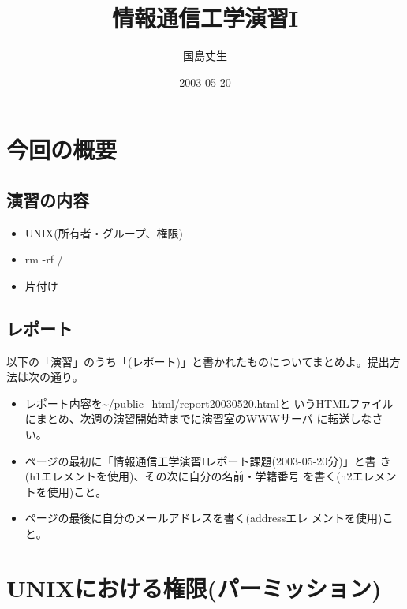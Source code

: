 \documentclass[a4j,10pt]{jarticle}
\begin{document}
\title{情報通信工学演習I}
\author{国島丈生}
\date{2003-05-20}
\maketitle
\section{今回の概要}
\subsection{演習の内容}
\begin{itemize}
 \item UNIX(所有者・グループ、権限)
 \item rm -rf /
 \item 片付け
\end{itemize}

\subsection{レポート}
以下の「演習」のうち「(レポート)」と書かれたものについてまとめよ。提出方
法は次の通り。
\begin{itemize}
 \item レポート内容を{\sffamily \~{}/public\_html/report20030520.html}と
       いうHTMLファイルにまとめ、次週の演習開始時までに演習室のWWWサーバ
       に転送しなさい。
 \item ページの最初に「情報通信工学演習Iレポート課題(2003-05-20分)」と書
       き({\sffamily h1}エレメントを使用)、その次に自分の名前・学籍番号
       を書く({\sffamily h2エレメントを使用})こと。
 \item ページの最後に自分のメールアドレスを書く({\sffamily address}エレ
       メントを使用)こと。
\end{itemize}

\section{UNIXにおける権限(パーミッション)}
\end{document}

